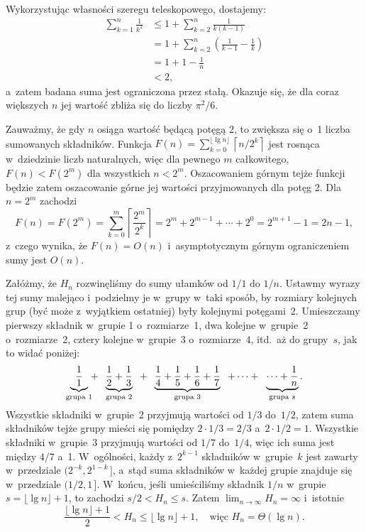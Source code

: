 
\exercise %
Wykorzystując własności szeregu teleskopowego, dostajemy:
\begin{align*}
	\sum_{k=1}^n\frac{1}{k^2} &\le 1+\sum_{k=2}^n\frac{1}{k(k-1)} \\
	&= 1+\sum_{k=2}^n\left(\frac{1}{k-1}-\frac{1}{k}\right) \\
	&= 1+1-\frac{1}{n} \\
	&< 2,
\end{align*}
a~zatem badana suma jest ograniczona przez stałą. Okazuje się, że dla coraz większych $n$ jej wartość zbliża się do liczby $\pi^2\!/6$.

\exercise %
Zauważmy, że gdy $n$ osiąga wartość będącą potęgą 2, to zwiększa się o~1 liczba sumowanych składników. Funkcja $F(n)=\sum_{k=0}^{\lfloor\lg n\rfloor}\left\lceil n/2^k\right\rceil$ jest rosnąca w~dziedzinie liczb naturalnych, więc dla pewnego $m$ całkowitego, $F(n)<F(2^m)$ dla wszystkich $n<2^m$. Oszacowaniem górnym tejże funkcji będzie zatem oszacowanie górne jej wartości przyjmowanych dla potęg 2. Dla $n=2^m$ zachodzi
\[
	F(n) = F(2^m) = \sum_{k=0}^m\left\lceil\frac{2^m}{2^k}\right\rceil = 2^m+2^{m-1}+\cdots+2^0 = 2^{m+1}-1 = 2n-1,
\]
z~czego wynika, że $F(n)=O(n)$ i~asymptotycznym górnym ograniczeniem sumy jest $O(n)$.

\exercise %
Załóżmy, że $H_n$ rozwinęliśmy do sumy ułamków od $1/1$ do $1/n$. Ustawmy wyrazy tej sumy malejąco i~podzielmy je w~grupy w~taki sposób, by rozmiary kolejnych grup (być może z~wyjątkiem ostatniej) były kolejnymi potęgami~2. Umieszczamy pierwszy składnik w~grupie 1 o~rozmiarze~1, dwa kolejne w~grupie~2 o~rozmiarze~2, cztery kolejne w~grupie~3 o~rozmiarze~4, itd.\ aż do grupy~$s$, jak to widać poniżej:
\[
	\underbrace{\frac{1}{1}}_{\text{\scriptsize grupa 1}}\!\!+\;\;\underbrace{\frac{1}{2}+\frac{1}{3}}_{\text{\scriptsize grupa 2}}\;\;+\;\;\underbrace{\frac{1}{4}+\frac{1}{5}+\frac{1}{6}+\frac{1}{7}}_{\text{\scriptsize grupa 3}}\;\;+\cdots+\;\;\underbrace{\cdots +\frac{1}{n}}_{\text{\scriptsize grupa $s$}}.
\]
Wszystkie składniki w~grupie~2 przyjmują wartości od $1/3$ do~$1/2$, zatem suma składników tejże grupy mieści się pomiędzy $2\cdot1/3=2/3$ a~$2\cdot1/2=1$. Wszystkie składniki w~grupie~3 przyjmują wartości od $1/7$ do~$1/4$, więc ich suma jest między $4/7$ a~1. W~ogólności, każdy z~$2^{k-1}$ składników w~grupie~$k$ jest zawarty w~przedziale $\bigl(2^{-k},2^{1-k}\,\bigr]$, a~stąd suma składników w~każdej grupie znajduje się w~przedziale $(1/2,1\,]$. W~końcu, jeśli umieściliśmy składnik $1/n$ w~grupie $s=\lfloor\lg n\rfloor+1$, to zachodzi $s/2<H_n\le s$. Zatem $\lim_{n\to\infty}H_n=\infty$ i~istotnie
\[
	\frac{\lfloor\lg n\rfloor+1}{2} < H_n \le \lfloor\lg n\rfloor+1, \quad\text{więc $H_n=\Theta(\lg n)$}.
\]

